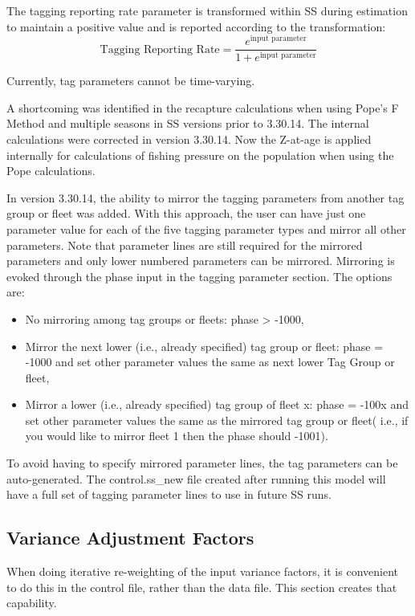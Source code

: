 The tagging reporting rate parameter is transformed within SS during estimation to maintain a positive value and is reported according to the transformation:
\begin{equation}
	\text{Tagging Reporting Rate} = \frac{e^{\text{input parameter}}}{1+e^{\text{input parameter}}}
\end{equation}

Currently, tag parameters cannot be time-varying.

A shortcoming was identified in the recapture calculations when using Pope's F Method and multiple seasons in SS versions prior to 3.30.14. The internal calculations were corrected in version 3.30.14. Now the Z-at-age is applied internally for calculations of fishing pressure on the population when using the Pope calculations.

In version 3.30.14, the ability to mirror the tagging parameters from another tag group or fleet was added. With this approach, the user can have just one parameter value for each of the five tagging parameter types and mirror all other parameters. Note that parameter lines are still required for the mirrored parameters and only lower numbered parameters can be mirrored. Mirroring is evoked through the phase input in the tagging parameter section.  The options are:
\begin{itemize}
	\item No mirroring among tag groups or fleets: phase > -1000,
	\item Mirror the next lower (i.e., already specified) tag group or fleet: phase = -1000 and set other parameter values the same as next lower Tag Group or fleet,
	\item Mirror a lower (i.e., already specified) tag group of fleet x: phase = -100x and set other parameter values the same as the mirrored tag group or fleet( i.e., if you would like to mirror fleet 1 then the phase should -1001).
\end{itemize}

To avoid having to specify mirrored parameter lines, the tag parameters can be auto-generated. The control.ss\_new file created after running this model will have a full set of tagging parameter lines to use in future SS runs.

\hypertarget{GcompVar}{}
\subsection{Variance Adjustment Factors}
When doing iterative re-weighting of the input variance factors, it is convenient to do this in the control file, rather than the data file.  This section creates that capability.


